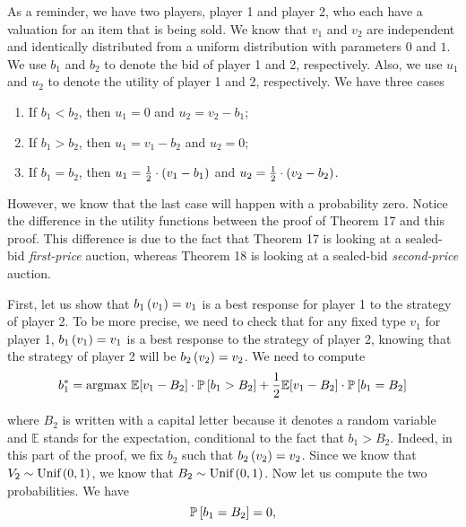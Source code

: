 As a reminder, we have two players, player 1 and player 2, who each have a valuation for an item that is being sold. We know that $v_1$ and $v_2$ are independent and identically distributed from a uniform distribution with parameters $0$ and $1$. We use $b_1$ and $b_2$ to denote the bid of player 1 and 2, respectively. Also, we use $u_1$ and $u_2$ to denote the utility of player 1 and 2, respectively. We have three cases
\begin{enumerate}
    \item If $b_1 < b_2$, then $u_1 = 0$ and $u_2 = v_2 - b_1$;
    \item If $b_1 > b_2$, then $u_1 = v_1 - b_2$ and $u_2 = 0$;
    \item If $b_1 = b_2$, then $u_1 = \frac{1}{2} \cdot \parent{v_1 - b_1}$ and $u_2 = \frac{1}{2} \cdot \parent{v_2 - b_2}$.
\end{enumerate}

However, we know that the last case will happen with a probability zero.
Notice the difference in the utility functions between the proof of Theorem 17 and this proof. This difference is due to the fact that Theorem 17 is looking at a sealed-bid \textit{first-price} auction, whereas Theorem 18 is looking at a sealed-bid \textit{second-price} auction.

\vspace{5mm}


First, let us show that $b_1 \parent{v_1} = v_1$ is a best response for player 1 to the strategy of player 2. To be more precise, we need to check that for any fixed type $v_1$ for player 1, $b_1 \parent{v_1} = v_1$ is a best response to the strategy of player 2, knowing that the strategy of player 2 will be $b_2 \parent{v_2} = v_2$.
We need to compute
\begin{equation*}
    b_1^{*}
    = \text{argmax} \
    \mathbb{E}[v_1 - B_2] \cdot \mathbb{P} \squared{b_1 > B_2}
    + \dfrac{1}{2}  \mathbb{E}[v_1 - B_2] \cdot \mathbb{P} \squared{b_1 = B_2}
\end{equation*}

where $B_2$ is written with a capital letter because it denotes a random variable and $\mathbb{E}$ stands for the expectation, conditional to the fact that $b_1>B_2$.
Indeed, in this part of the proof, we fix $b_2$ such that $b_2 \parent{v_2} = v_2$. Since we know that $V_2 \sim \text{Unif} \parent{0, 1}$, we know that $B_2 \sim \text{Unif} \parent{0, 1}$. Now let us compute the two probabilities. We have
\begin{equation*}
    \mathbb{P} \squared{b_1 = B_2}
    = 0,
\end{equation*}

